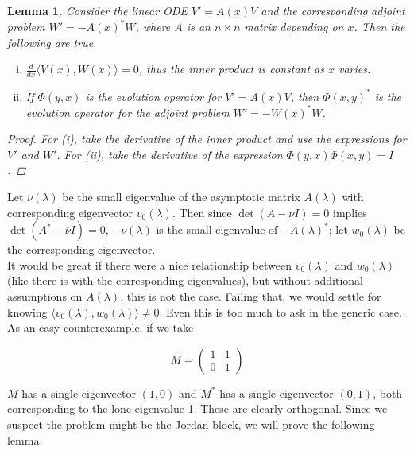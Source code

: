 \documentclass[12pt]{article}
\newtheorem{lemma}{Lemma}
\begin{document}
\begin{lemma}\label{eigadjoint}
Consider the linear ODE $V' = A(x)V$ and the corresponding adjoint problem $W' = -A(x)^* W$, where $A$ is an $n \times n$ matrix depending on $x$. Then the following are true.
\begin{enumerate}[(i)]
\item $\frac{d}{dx}\langle V(x), W(x) \rangle = 0$, thus the inner product is constant as $x$ varies.
\item If $\Phi(y, x)$ is the evolution operator for $V' = A(x)V$, then $\Phi(x, y)^*$ is the evolution operator for the adjoint problem $W' = -W(x)^* W$.
\end{enumerate}
\begin{proof}
For (i), take the derivative of the inner product and use the expressions for $V'$ and $W'$. For (ii), take the derivative of the expression $\Phi(y, x)\Phi(x, y) = I$.
\end{proof}
\end{lemma}

Let $\nu(\lambda)$ be the small eigenvalue of the asymptotic matrix $A(\lambda)$ with corresponding eigenvector $v_0(\lambda)$. Then since $\det(A - \nu I) = 0$ implies $\det(A^* - \overline{\nu}I) = 0$, $-\overline{\nu(\lambda)}$ is the small eigenvalue of $-A(\lambda)^*$; let $w_0(\lambda)$ be the corresponding eigenvector.\\

It would be great if there were a nice relationship between $v_0(\lambda)$ and $w_0(\lambda)$ (like there is with the corresponding eigenvalues), but without additional assumptions on $A(\lambda)$, this is not the case. Failing that, we would settle for knowing $\langle v_0(\lambda), w_0(\lambda) \rangle \neq 0$. Even this is too much to ask in the generic case. As an easy counterexample, if we take

\[
M = \begin{pmatrix}1 & 1 \\ 0 & 1 \end{pmatrix}
\]

$M$ has a single eigenvector $(1, 0)$ and $M^*$ has a single eigenvector $(0, 1)$, both corresponding to the lone eigenvalue 1. These are clearly orthogonal. Since we suspect the problem might be the Jordan block, we will prove the following lemma.
\end{document}
